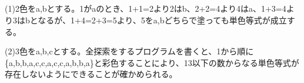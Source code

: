 \subsection{}
(1)2色をa,bとする。1がaのとき、1+1=2より2はb、2+2=4より4はa、1+3=4より3はbとなるが、1+4=2+3=5より、5をa,bどちらで塗っても単色等式が成立する。

(2)3色をa,b,cとする。全探索をするプログラムを書くと、1から順に\\
\{a,b,b,a,c,c,a,c,c,a,b,b,a\}と彩色することにより、13以下の数からなる単色等式が存在しないようにできることが確かめられる。
